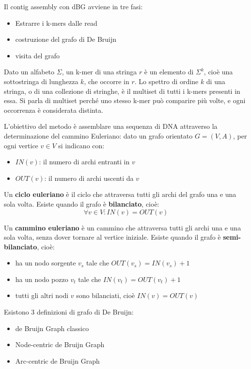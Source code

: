 Il contig assembly con dBG avviene in tre fasi:
\begin{itemize}
    \item Estrarre i k-mers dalle read
    \item costruzione del grafo di De Bruijn
    \item visita del grafo
\end{itemize}

Dato un alfabeto $\Sigma$, un k-mer di una stringa $r$ è un elemento di $\Sigma^k$, cioè una sottostringa di lunghezza $k$,
che occorre in $r$. Lo spettro di ordine $k$ di una stringa, o di una collezione di stringhe, 
è il multiset di tutti i k-mers presenti in essa. Si parla di multiset perché uno stesso k-mer
può comparire più volte, e ogni occorrenza è considerata distinta.

L'obiettivo del metodo è assemblare una sequenza di DNA attraverso la
determinazione del cammino Euleriano:
dato un grafo orientato $G = (V, A)$, per ogni vertice $v \in V$ si indicano con:
\begin{itemize}
    \item $IN(v)$: il numero di archi entranti in $v$
    \item $OUT(v)$: il numero di archi uscenti da $v$
\end{itemize}

Un \textbf{ciclo euleriano} è il ciclo che attraversa tutti gli archi del grafo una e una sola volta. Esiste quando il grafo è \textbf{bilanciato}, cioè:
\[
    \forall v \in V: IN(v) = OUT(v)
\]

Un \textbf{cammino euleriano} è un cammino che attraversa tutti gli archi una e una sola volta, senza dover
tornare al vertice iniziale. Esiste quando il grafo è \textbf{semi-bilanciato}, cioè: 
\begin{itemize}
    \item ha un nodo sorgente $v_s$ tale che $OUT(v_s) = IN(v_s) + 1$
    \item ha un nodo pozzo $v_t$ tale che $IN(v_t) = OUT(v_t) + 1$
    \item tutti gli altri nodi $v$ sono bilanciati, cioè $IN(v) = OUT(v)$
\end{itemize}

Esistono 3 definizioni di grafo di De Bruijn:
\begin{itemize}
    \item de Bruijn Graph classico
    \item Node-centric de Bruijn Graph
    \item Arc-centric de Bruijn Graph
\end{itemize}


